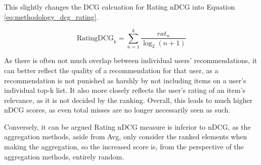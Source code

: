  This slightly changes the DCG calcuation for Rating nDCG into Equation \ref{eq:methodology_dcg_rating}.

\begin{equation}\label{eq:methodology_dcg_rating}
\text{RatingDCG}_k = \sum_{n=1}^{k}\frac{\textit{rat}_n}{\log_2(n + 1)}
\end{equation}

As there is often not much overlap between individual users' recommendations, it can better reflect the quality of a recommendation for that user, as a recommendation is not punished as harshly by not including items on a user's individual top-k list. It also more closely reflects the user's rating of an item's relevance, as it is not decided by the ranking. Overall, this leads to much higher nDCG scores, as even total misses are no longer necessarily seen as such.

Conversely, it can be argued Rating nDCG measure is inferior to nDCG, as the aggregation methods, aside from Avg, only consider the ranked elements when making the aggregation, so the increased score is, from the perspective of the aggregation methods, entirely random.